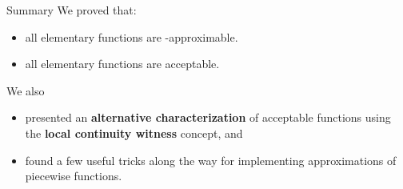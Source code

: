 \begin{frame}{Summary}
    We proved that:
    \pause
    \begin{itemize}
        \item all elementary functions are \WhileCC-approximable.
        \pause \item all elementary functions are acceptable.
    \end{itemize}
     \pause We also 
    \begin{itemize}
         \item  presented an \textbf{alternative characterization} of acceptable functions \pause using the \textbf{local continuity witness} concept, and
         \item found a few useful tricks along the way for implementing approximations of piecewise functions.
    \end{itemize}
\end{frame}

